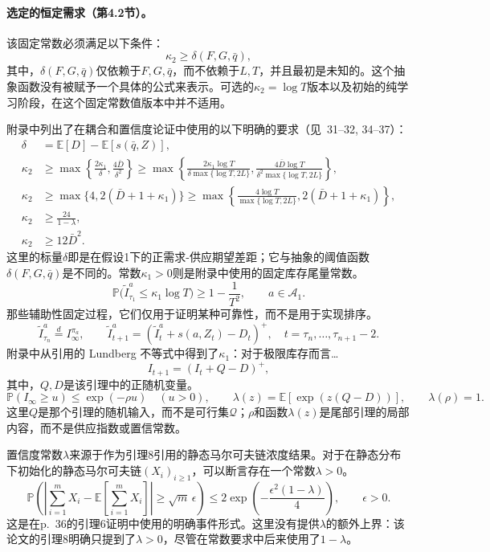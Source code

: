 \documentclass{article}
\begin{document}
\paragraph{选定的恒定需求（第4.2节）。}
该固定常数必须满足以下条件：
\[
\kappa_2\geq\delta(F,G,\bar q),
\]
其中，\(\delta(F,G,\bar q)\)仅依赖于\(F,G,\bar q\)，而不依赖于\(L,T\)，并且最初是未知的。这个抽象函数没有被赋予一个具体的公式来表示。可选的\(\kappa_2=\log T\)版本以及初始的纯学习阶段，在这个固定常数值版本中并不适用。

附录中列出了在耦合和置信度论证中使用的以下明确的要求（见\ 31–32, 34–37）：
\begin{align*}
\delta&=\mathbb E[D]-\mathbb E[s(\bar q,Z)],\\
\kappa_2&\geq\max\left\{\frac{2\kappa_1}{\delta},\frac{4\bar D}{\delta^2}\right\}
\geq\max\left\{
\frac{2\kappa_1\log T}{\delta\max\{\log T,2L\}},
\frac{4\bar D\log T}{\delta^2\max\{\log T,2L\}}
\right\},\\
\kappa_2&\geq\max\{4,2(\bar D+1+\kappa_1)\}
\geq\max\left\{\frac{4\log T}{\max\{\log T,2L\}},
2(\bar D+1+\kappa_1)\right\},\\
\kappa_2&\geq\frac{24}{1-\lambda},\\
\kappa_2&\geq12\bar D^2.
\end{align*}
这里的标量\(\delta\)即是在假设1下的正需求-供应期望差距；它与抽象的阈值函数\(\delta(F,G,\bar q)\)是不同的。常数\(\kappa_1>0\)则是附录中使用的固定库存尾量常数。
\[
\mathbb P\big(\tilde I^a_{\tau_1}\leq\kappa_1\log T\big)
\geq1-\frac{1}{T^2},\qquad a\in\mathcal A_1.
\]
那些辅助性固定过程，它们仅用于证明某种可靠性，而不是用于实现排序。
\begin{equation}
\tilde I^a_{\tau_n}\overset d=I_\infty^{\pi_a},\qquad
\tilde I^a_{t+1}=(\tilde I^a_t+s(a,Z_t)-D_t)^+,
\quad t=\tau_n,\ldots,\tau_{n+1}-2.\tag{15}
\end{equation}
附录中从引用的 Lundberg 不等式中得到了\(\kappa_1\)：对于极限库存而言…
\[
I_{t+1}=(I_t+Q-D)^+,
\]
其中，\(Q,D\)是该引理中的正随机变量。
\[
\mathbb P(I_\infty\geq u)\leq\exp(-\rho u)\quad(u>0),
\qquad
\lambda(z)=\mathbb E[\exp(z(Q-D))],\qquad\lambda(\rho)=1.
\]
这里\(Q\)是那个引理的随机输入，而不是可行集\(\mathcal Q\)；\(\rho\)和函数\(\lambda(z)\)是尾部引理的局部内容，而不是供应指数或置信常数。

置信度常数\(\lambda\)来源于作为引理8引用的静态马尔可夫链浓度结果。对于在静态分布下初始化的静态马尔可夫链\((X_i)_{i\geq1}\)，可以断言存在一个常数\(\lambda>0\)。
\[
\mathbb P\left(
\left|\sum_{i=1}^{m}X_i-\mathbb E\left[\sum_{i=1}^{m}X_i\right]\right|
\geq\sqrt m\,\epsilon
\right)
\leq2\exp\left(-\frac{\epsilon^2(1-\lambda)}4\right),
\qquad\epsilon>0.
\]
这是在p.\ 36的引理6证明中使用的明确事件形式。这里没有提供\(\lambda\)的额外上界：该论文的引理8明确只提到了\(\lambda>0\)，尽管在常数要求中后来使用了\(1-\lambda\)。
\end{document}
